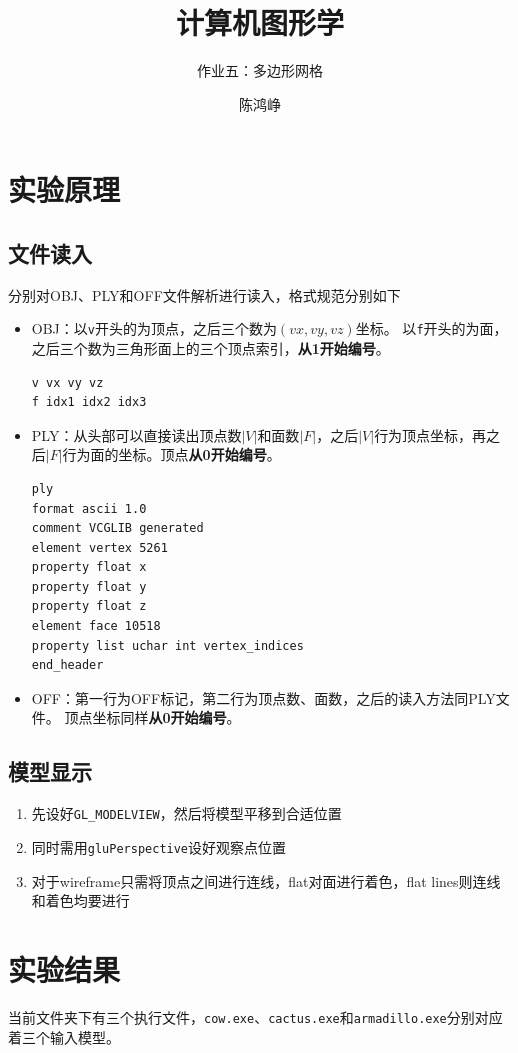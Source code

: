 \documentclass[logo,reportComp]{thesis}
\title{计算机图形学}
\subtitle{作业五：多边形网格}
\author{陈鸿峥}
\begin{document}
\maketitle

\section{实验原理}
\subsection{文件读入}
分别对OBJ、PLY和OFF文件解析进行读入，格式规范分别如下
\begin{itemize}
	\item OBJ：以\verb'v'开头的为顶点，之后三个数为$(vx,vy,vz)$坐标。
	以\verb'f'开头的为面，之后三个数为三角形面上的三个顶点索引，\textbf{从1开始编号}。
\begin{lstlisting}
v vx vy vz
f idx1 idx2 idx3
\end{lstlisting}
	\item PLY：从头部可以直接读出顶点数$|V|$和面数$|F|$，之后$|V|$行为顶点坐标，再之后$|F|$行为面的坐标。顶点\textbf{从0开始编号}。
\begin{lstlisting}
ply
format ascii 1.0
comment VCGLIB generated
element vertex 5261
property float x
property float y
property float z
element face 10518
property list uchar int vertex_indices
end_header
\end{lstlisting}
	\item OFF：第一行为OFF标记，第二行为顶点数、面数，之后的读入方法同PLY文件。
	顶点坐标同样\textbf{从0开始编号}。
\end{itemize}

\subsection{模型显示}
\begin{enumerate}
	\item 先设好\verb'GL_MODELVIEW'，然后将模型平移到合适位置
	\item 同时需用\verb'gluPerspective'设好观察点位置
	\item 对于wireframe只需将顶点之间进行连线，flat对面进行着色，flat lines则连线和着色均要进行
\end{enumerate}

\section{实验结果}
当前文件夹下有三个执行文件，\verb'cow.exe'、\verb'cactus.exe'和\verb'armadillo.exe'分别对应着三个输入模型。
\end{document}
